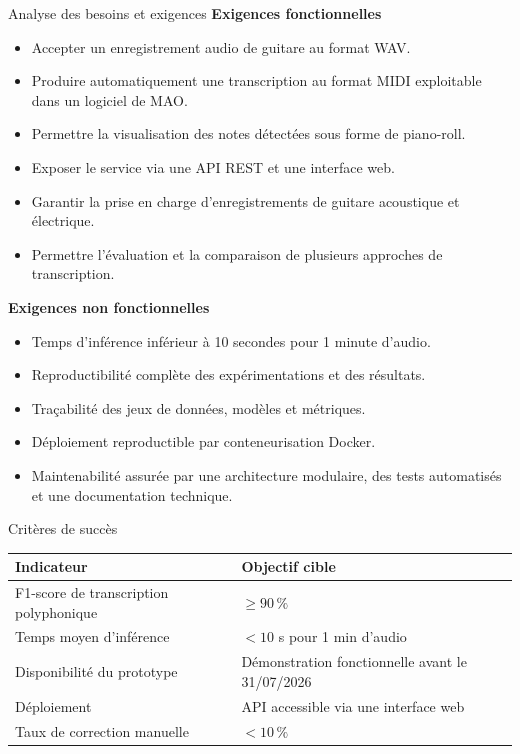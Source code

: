 \begin{frame}{Analyse des besoins et exigences}
    \textbf{Exigences fonctionnelles}\\
    \begin{itemize}
    	\item Accepter un enregistrement audio de guitare au format WAV.
    	\item Produire automatiquement une transcription au format MIDI exploitable dans un logiciel de MAO.
    	\item Permettre la visualisation des notes détectées sous forme de piano-roll.
    	\item Exposer le service via une API REST et une interface web.
    	\item Garantir la prise en charge d'enregistrements de guitare acoustique et électrique.
    	\item Permettre l'évaluation et la comparaison de plusieurs approches de transcription.
    \end{itemize}
    
    \vspace{0.2cm}
    
    \textbf{Exigences non fonctionnelles}\\
    \begin{itemize}
    	\item Temps d'inférence inférieur à 10 secondes pour 1 minute d'audio.
    	\item Reproductibilité complète des expérimentations et des résultats.
    	\item Traçabilité des jeux de données, modèles et métriques.
    	\item Déploiement reproductible par conteneurisation Docker.
    	\item Maintenabilité assurée par une architecture modulaire, des tests automatisés et une documentation technique.
    \end{itemize}
\end{frame}

\begin{frame}{Critères de succès}
	\centering
	\begin{tabular}{ll}
		\toprule
		\textbf{Indicateur} & \textbf{Objectif cible} \\
		\midrule
		F1-score de transcription polyphonique & $\geq 90\,\%$ \\
		Temps moyen d'inférence & $< 10$ s pour 1 min d'audio \\
		Disponibilité du prototype & Démonstration fonctionnelle avant le 31/07/2026 \\
		Déploiement & API accessible via une interface web \\
		Taux de correction manuelle & $< 10\,\%$ \\
		\bottomrule
	\end{tabular}
\end{frame}

